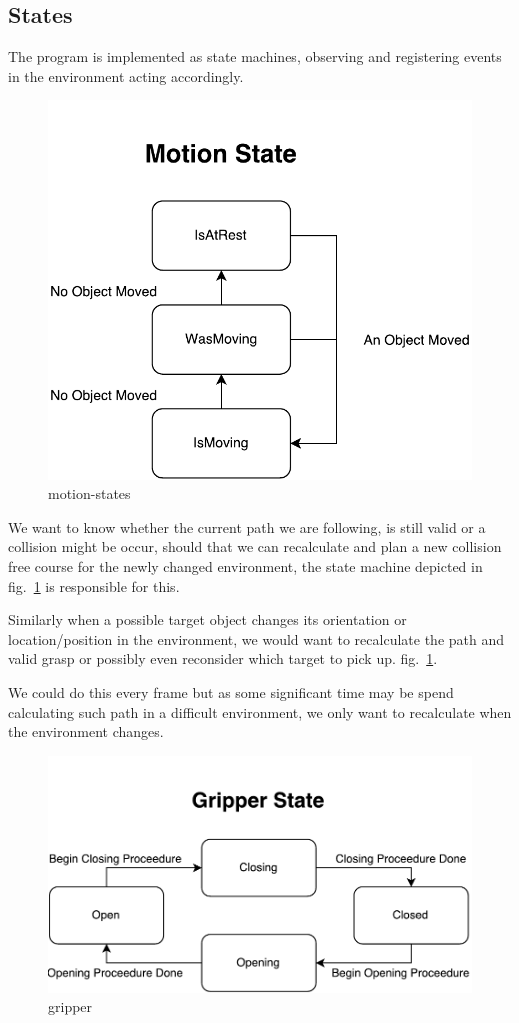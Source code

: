 \subsection{States}\label{sec:states}

The program is implemented as state machines, observing and registering events in the environment acting accordingly.

\begin{figure}
\centering
\includegraphics[width=.4\linewidth]{figures/statediagrams/motion-states.pdf}
\caption{motion-states}
\label{fig:motion-states}
\end{figure}

We want to know whether the current path we are following, is still valid or a collision might be occur, should that we can recalculate and plan a new collision free course for the newly changed environment, the state machine depicted in fig.~\ref{fig:motion-states} is responsible for this.

Similarly when a possible target object changes its orientation or location/position in the environment, we would want to recalculate the path and valid grasp or possibly even reconsider which target to pick up. fig.~\ref{fig:motion-states}.

We could do this every frame but as some significant time may be spend calculating such path in a difficult environment, we only want to recalculate when the environment changes.

\begin{figure}
\centering
\includegraphics[width=.6\linewidth]{figures/statediagrams/gripper.pdf}
\caption{gripper}
\label{fig:gripper}
\end{figure}

